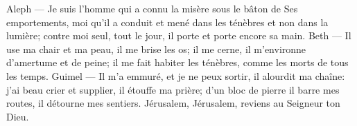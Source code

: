 Aleph --- Je suis l’homme qui a connu la misère sous le bâton de Ses emportements,
	moi qu’il a conduit et mené dans les ténèbres et non dans la lumière;
	contre moi seul, tout le jour, il porte et porte encore sa main.
Beth --- Il use ma chair et ma peau, il me brise les os;
	il me cerne, il m’environne d’amertume et de peine;
	il me fait habiter les ténèbres, comme les morts de tous les temps.
Guimel --- Il m’a emmuré, et je ne peux sortir, il alourdit ma chaîne:
	j’ai beau crier et supplier, il étouffe ma prière;
	d’un bloc de pierre il barre mes routes, il détourne mes sentiers.
Jérusalem, Jérusalem, reviens au Seigneur ton Dieu.
